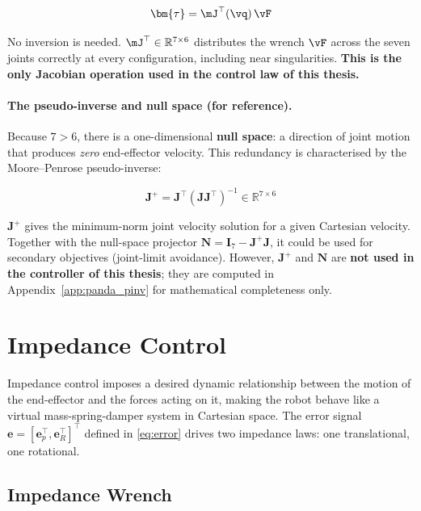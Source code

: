 \begin{equation}
\label{eq:jT_use}
\bm{\tau} = \mJ^\top(\vq)\,\vF
\end{equation}

No inversion is needed.
$\mJ^\top\in\mathbb{R}^{7\times6}$ distributes the wrench $\vF$
across the seven joints correctly at every configuration, including
near singularities.
\textbf{This is the only Jacobian operation used in the control law
of this thesis.}

\paragraph{The pseudo-inverse and null space (for reference).}
Because $7>6$, there is a one-dimensional \textbf{null space}: a
direction of joint motion that produces \emph{zero} end-effector
velocity.
This redundancy is characterised by the Moore--Penrose pseudo-inverse:

\begin{equation}
\label{eq:pinv}
\mathbf{J}^+ = \mathbf{J}^\top(\mathbf{J}\mathbf{J}^\top)^{-1}
\in\mathbb{R}^{7\times6}
\end{equation}

$\mathbf{J}^+$ gives the minimum-norm joint velocity solution for a
given Cartesian velocity.
Together with the null-space projector
$\mathbf{N}=\mathbf{I}_7-\mathbf{J}^+\mathbf{J}$, it could be used
for secondary objectives (joint-limit avoidance).
However, $\mathbf{J}^+$ and $\mathbf{N}$ are \textbf{not used in the
controller of this thesis}; they are computed in
Appendix~\ref{app:panda_pinv} for mathematical completeness only.

\section{Impedance Control}
\label{sec:impedance}

Impedance control \cite{Hogan1985} imposes a desired dynamic
relationship between the motion of the end-effector and the forces
acting on it, making the robot behave like a virtual mass-spring-damper
system in Cartesian space.
The error signal $\mathbf{e}=[\mathbf{e}_p^\top,\mathbf{e}_R^\top]^\top$
defined in \cref{eq:error} drives two impedance laws: one translational,
one rotational.

\subsection{Impedance Wrench}

